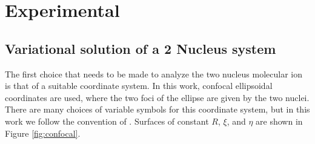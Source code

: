 \documentclass[journal=jacsat,manuscript=communication]{achemso}
\begin{document}
\section{Experimental}
\subsection{Variational solution of a 2 Nucleus system}
The first choice that needs to be made to analyze the two nucleus  molecular ion is that of a suitable coordinate system.  In this work, confocal ellipsoidal coordinates are used, where the two foci of the ellipse are given by the two nuclei.  There are many choices of variable symbols for this coordinate system, but in this work we follow the convention of \citet{morgensternUnderstandingQuantumMechanical2023}.  Surfaces of constant $R$, $\xi$, and $\eta$ are shown in Figure \ref{fig:confocal}.
\end{document}
